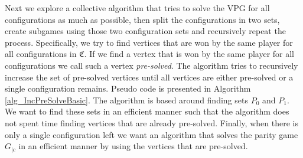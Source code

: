 Next we explore a collective algorithm that tries to solve the VPG for all configurations as much as possible, then split the configurations in two sets, create subgames using those two configuration sets and recursively repeat the process. Specifically, we try to find vertices that are won by the same player for all configurations in $\mathfrak{C}$. If we find a vertex that is won by the same player for all configurations we call such a vertex \textit{pre-solved}. The algorithm tries to recursively increase the set of pre-solved vertices until all vertices are either pre-solved or a single configuration remains. Pseudo code is presented in Algorithm \ref{alg_IncPreSolveBasic}. The algorithm is based around finding sets $P_0$ and $P_1$. We want to find these sets in an efficient manner such that the algorithm does not spent time finding vertices that are already pre-solved. Finally, when there is only a single configuration left we want an algorithm that solves the parity game $G_{|c}$ in an efficient manner by using the vertices that are pre-solved.

